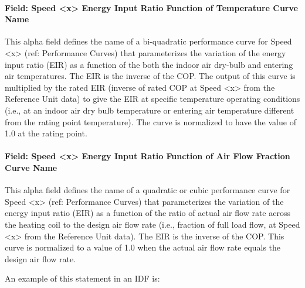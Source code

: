 \paragraph{Field: Speed \textless{}x\textgreater{} Energy Input Ratio Function of Temperature Curve Name}\label{field-speed-x-energy-input-ratio-function-of-temperature-curve-name-3}

This alpha field defines the name of a bi-quadratic performance curve for Speed \textless{}x\textgreater{} (ref: Performance Curves) that parameterizes the variation of the energy input ratio (EIR) as a function of the both the indoor air dry-bulb and entering air temperatures. The EIR is the inverse of the COP. The output of this curve is multiplied by the rated EIR (inverse of rated COP at Speed \textless{}x\textgreater{} from the Reference Unit data) to give the EIR at specific temperature operating conditions (i.e., at an indoor air dry bulb temperature or entering air temperature different from the rating point temperature). The curve is normalized to have the value of 1.0 at the rating point.

\paragraph{Field: Speed \textless{}x\textgreater{} Energy Input Ratio Function of Air Flow Fraction Curve Name}\label{field-speed-x-energy-input-ratio-function-of-air-flow-fraction-curve-name-1}

This alpha field defines the name of a quadratic or cubic performance curve for Speed \textless{}x\textgreater{} (ref: Performance Curves) that parameterizes the variation of the energy input ratio (EIR) as a function of the ratio of actual air flow rate across the heating coil to the design air flow rate (i.e., fraction of full load flow, at Speed \textless{}x\textgreater{} from the Reference Unit data). The EIR is the inverse of the COP. This curve is normalized to a value of 1.0 when the actual air flow rate equals the design air flow rate.

An example of this statement in an IDF is:

